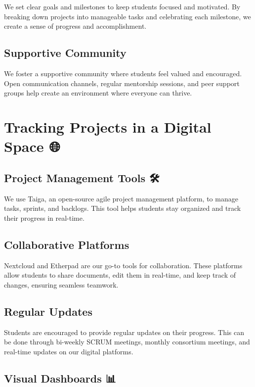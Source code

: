 \documentclass[
  letterpaper,
  DIV=11,
  numbers=noendperiod]{scrreprt}
\begin{document}
We set clear goals and milestones to keep students focused and
motivated. By breaking down projects into manageable tasks and
celebrating each milestone, we create a sense of progress and
accomplishment.

\subsection{Supportive Community 🤝}\label{supportive-community}

We foster a supportive community where students feel valued and
encouraged. Open communication channels, regular mentorship sessions,
and peer support groups help create an environment where everyone can
thrive.

\section{Tracking Projects in a Digital Space
🌐}\label{tracking-projects-in-a-digital-space}

\subsection{Project Management Tools 🛠️}\label{project-management-tools}

We use Taiga, an open-source agile project management platform, to
manage tasks, sprints, and backlogs. This tool helps students stay
organized and track their progress in real-time.

\subsection{Collaborative Platforms 👥}\label{collaborative-platforms}

Nextcloud and Etherpad are our go-to tools for collaboration. These
platforms allow students to share documents, edit them in real-time, and
keep track of changes, ensuring seamless teamwork.

\subsection{Regular Updates 📅}\label{regular-updates}

Students are encouraged to provide regular updates on their progress.
This can be done through bi-weekly SCRUM meetings, monthly consortium
meetings, and real-time updates on our digital platforms.

\subsection{Visual Dashboards 📊}\label{visual-dashboards}
\end{document}
